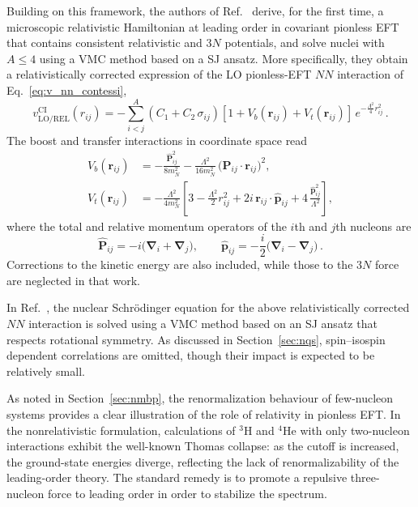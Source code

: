Building on this framework, the authors of Ref.~\cite{yang_consistent_2022}
derive, for the first time, a microscopic relativistic Hamiltonian at
leading order in covariant pionless EFT that contains consistent
relativistic and $3N$ potentials, and solve nuclei with $A \leq 4$ using a
VMC method based on a SJ ansatz. More specifically, they obtain a
relativistically corrected expression of the LO pionless-EFT $NN$
interaction of Eq.~\eqref{eq:v_nn_contessi},
\begin{equation}
v_{\mathrm{LO / REL}}^{\mathrm{CI}}(r_{ij}) = - \sum_{i<j}^A
\left(C_1 + C_2\,\sigma_{ij} \right)
\left[ 1 + V_b(\mathbf r_{ij}) + V_t(\mathbf r_{ij}) \right]
\, e^{-\frac{\Lambda^2}{4} r_{ij}^2} \, .
\label{eq:V_rel}
\end{equation}
The boost and transfer interactions in coordinate space read
\begin{align}
V_b(\mathbf r_{ij})
&= - \frac{\hat{\mathbf P}_{ij}^2}{8 m_N^2}
   - \frac{\Lambda^2}{16 m_N^2}\,
     \bigl(\hat{\mathbf P}_{ij} \cdot \mathbf r_{ij}\bigr)^2 ,
\label{eq:Vb}\\[2mm]
V_t(\mathbf r_{ij})
&= - \frac{\Lambda^2}{4 m_N^2}
\left[
  3 - \frac{\Lambda^2}{2} r_{ij}^2
  + 2 i\,\mathbf r_{ij} \cdot \hat{\mathbf p}_{ij}
  + 4\,\frac{\hat{\mathbf p}_{ij}^2}{\Lambda^2}
\right] ,
\label{eq:Vt}
\end{align}
where the total and relative momentum operators of the $i$th and $j$th
nucleons are
\begin{equation}
\hat{\mathbf P}_{ij} = -i \bigl(\boldsymbol{\nabla}_i + \boldsymbol{\nabla}_j\bigr),
\qquad
\hat{\mathbf p}_{ij} = -\frac{i}{2}
\bigl(\boldsymbol{\nabla}_i - \boldsymbol{\nabla}_j\bigr) \, .
\label{eq:Pmom}
\end{equation}
Corrections to the kinetic energy are also included, while those to the
$3N$ force are neglected in that work.

In Ref.~\cite{yang_consistent_2022}, the nuclear Schr\"odinger equation for the above relativistically corrected $NN$ interaction is solved using a VMC method based on an SJ ansatz that respects rotational symmetry. As discussed in Section~\ref{sec:nqs}, spin--isospin dependent correlations are omitted, though their impact is expected to be relatively small.

As noted in Section~\ref{sec:nmbp}, the renormalization behaviour of
few-nucleon systems provides a clear illustration of the role of
relativity in pionless EFT. In the nonrelativistic formulation,
calculations of $^3\mathrm{H}$ and $^4\mathrm{He}$ with only two-nucleon
interactions exhibit the well-known Thomas collapse: as the cutoff is
increased, the ground-state energies diverge, reflecting the lack of
renormalizability of the leading-order theory. The standard remedy is to
promote a repulsive three-nucleon force to leading order in order to
stabilize the spectrum.

